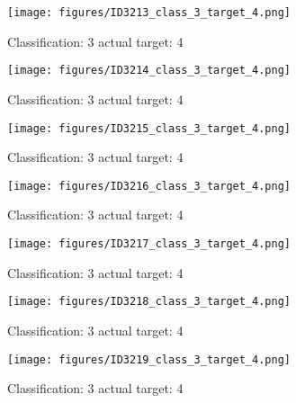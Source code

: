 \begin{figure}[h!]
\begin{center}
\texttt{[image: figures/ID3213\_class\_3\_target\_4.png]}
\end{center}
\caption{ Classification: 3 actual target: 4}
\label{fig:ID3213_class_3_target_4}
\end{figure}
\begin{figure}[h!]
\begin{center}
\texttt{[image: figures/ID3214\_class\_3\_target\_4.png]}
\end{center}
\caption{ Classification: 3 actual target: 4}
\label{fig:ID3214_class_3_target_4}
\end{figure}
\begin{figure}[h!]
\begin{center}
\texttt{[image: figures/ID3215\_class\_3\_target\_4.png]}
\end{center}
\caption{ Classification: 3 actual target: 4}
\label{fig:ID3215_class_3_target_4}
\end{figure}
\begin{figure}[h!]
\begin{center}
\texttt{[image: figures/ID3216\_class\_3\_target\_4.png]}
\end{center}
\caption{ Classification: 3 actual target: 4}
\label{fig:ID3216_class_3_target_4}
\end{figure}
\begin{figure}[h!]
\begin{center}
\texttt{[image: figures/ID3217\_class\_3\_target\_4.png]}
\end{center}
\caption{ Classification: 3 actual target: 4}
\label{fig:ID3217_class_3_target_4}
\end{figure}
\begin{figure}[h!]
\begin{center}
\texttt{[image: figures/ID3218\_class\_3\_target\_4.png]}
\end{center}
\caption{ Classification: 3 actual target: 4}
\label{fig:ID3218_class_3_target_4}
\end{figure}
\begin{figure}[h!]
\begin{center}
\texttt{[image: figures/ID3219\_class\_3\_target\_4.png]}
\end{center}
\caption{ Classification: 3 actual target: 4}
\label{fig:ID3219_class_3_target_4}
\end{figure}
